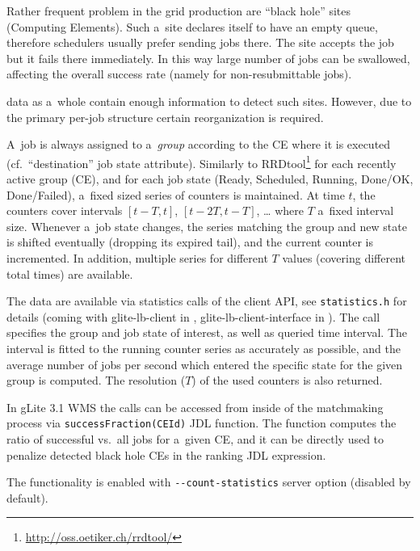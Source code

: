Rather frequent problem in the grid production are ``black hole'' sites (Computing Elements).
Such a~site declares itself to have an empty queue, therefore schedulers usually prefer sending
jobs there. The site accepts the job but it fails there immediately.
In this way large number of jobs can be swallowed, affecting the overall success rate
(namely for non-resubmittable jobs).

\LB data as a~whole contain enough information to detect such sites.
However, due to the primary per-job structure certain reorganization is required.

A~job is always assigned to a~\emph{group} according to
the CE where it is executed (cf.\ ``destination'' job state attribute).
Similarly to RRDtool\footnote{\url{http://oss.oetiker.ch/rrdtool/}}
for each recently active group (CE),
and for each job state (Ready, Scheduled, Running, Done/OK, Done/Failed),
a~fixed sized series of counters is maintained.
At time $t$, the counters cover intervals $[t-T,t]$, $[t-2T,t-T]$, \dots
where $T$ a~fixed interval size.
Whenever a~job state changes, the series matching the group and new state
is shifted eventually (dropping its expired tail), and the current counter
is incremented.
In addition, multiple series for different $T$ values (\ie covering different
total times) are available. 

The data are available via statistics calls of the client API,
see \verb'statistics.h' for details (coming with glite-lb-client in ,
glite-lb-client-interface in ).
The call specifies the group and job state of interest, as well as queried
time interval.
The interval is fitted to the running counter series as accurately as possible,
and the average number of jobs per second which entered the specific state for
the given group is computed.  The resolution ($T$) of the used counters is also
returned.

\begin{sloppypar}
In gLite 3.1 WMS the calls can be accessed from inside of the matchmaking process
via \verb'successFraction(CEId)'
JDL function.
The function computes the ratio of successful vs.\ all jobs for a~given CE,
and it can be directly used to penalize detected black hole CEs in the ranking
JDL expression.
\end{sloppypar}


The functionality is enabled with \verb'--count-statistics' \LB server option
(disabled by default).


